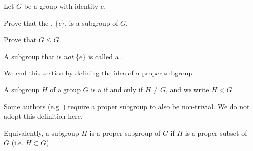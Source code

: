 \newpage

\begin{exercise}
    Let $G$ be a group with identity $e$.
    \begin{partquestions}{\alph*}
        \item Prove that the , $\{e\}$, is a subgroup of $G$.
        \item Prove that $G \leq G$.
    \end{partquestions}
\end{exercise}
\begin{remark}
    A subgroup that is \textit{not} $\{e\}$ is called a .
\end{remark}

We end this section by defining the idea of a proper subgroup.
\begin{definition}
    A subgroup $H$ of a group $G$ is a  if and only if $H \neq G$, and we write $H < G$.
\end{definition}
\begin{remark}
    Some authors (e.g. {\cite[p.~32]{hungerford_1980}}) require a proper subgroup to also be non-trivial. We do not adopt this definition here.
\end{remark}
\begin{remark}
    Equivalently, a subgroup $H$ is a proper subgroup of $G$ if $H$ is a proper subset of $G$ (i.e. $H \subset G$).
\end{remark}


